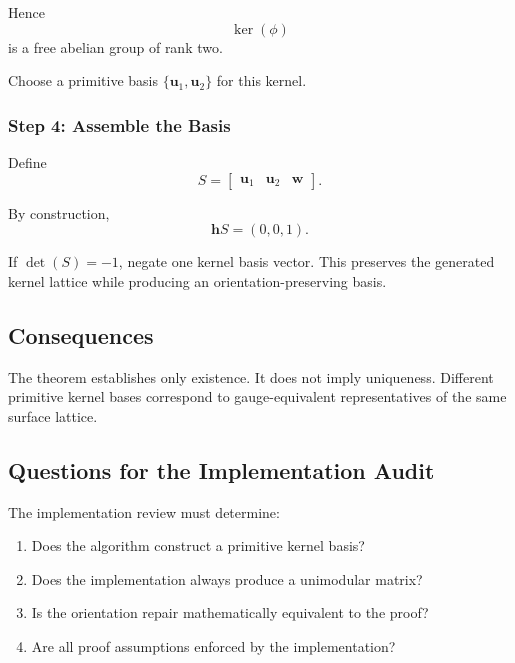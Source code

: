 Hence
\[
\ker(\phi)
\]
is a free abelian group of rank two.

Choose a primitive basis
$\{\mathbf u_1,\mathbf u_2\}$ for this kernel.

\subsubsection*{Step 4: Assemble the Basis}

Define
\[
S=
\begin{bmatrix}
\mathbf u_1 &
\mathbf u_2 &
\mathbf w
\end{bmatrix}.
\]

By construction,
\[
\mathbf hS=(0,0,1).
\]

If $\det(S)=-1$, negate one kernel basis vector. This preserves the
generated kernel lattice while producing an orientation-preserving basis.

\subsection{Consequences}

The theorem establishes only existence. It does not imply uniqueness.
Different primitive kernel bases correspond to gauge-equivalent
representatives of the same surface lattice.

\subsection{Questions for the Implementation Audit}

The implementation review must determine:

\begin{enumerate}
\item Does the algorithm construct a primitive kernel basis?
\item Does the implementation always produce a unimodular matrix?
\item Is the orientation repair mathematically equivalent to the proof?
\item Are all proof assumptions enforced by the implementation?
\end{enumerate}
